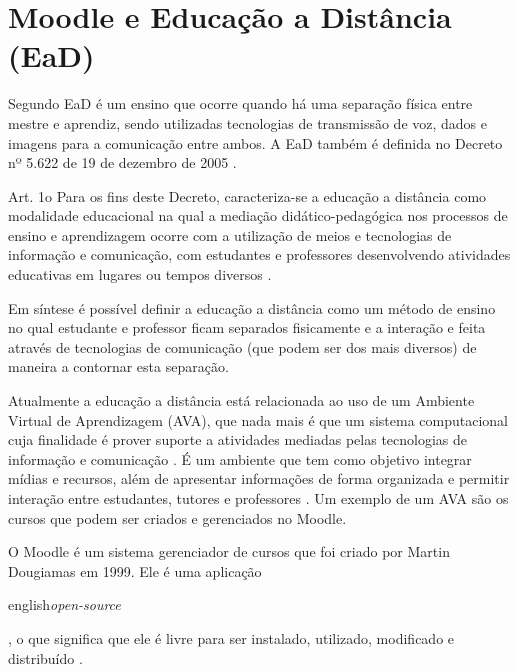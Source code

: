 \documentclass[
	12pt,				%
	openright,			%
	oneside,			%
	a4paper,			%
	english,			%
	french,				%
	spanish,			%
	brazil				%
	]{abntex2}
\begin{document}
\section{Moodle e Educação a Distância (EaD)}\label{cap-ead}

Segundo  EaD é um ensino que ocorre quando há uma separação física entre mestre e aprendiz, sendo utilizadas tecnologias de transmissão de voz, dados e imagens para a comunicação entre ambos. A EaD também é definida no Decreto nº 5.622 de 19 de dezembro de 2005 \cite{BRASIL2005}.
 \begin{citacao}
 	Art. 1o  Para os fins deste Decreto, caracteriza-se a educação a distância como modalidade educacional na qual a mediação didático-pedagógica nos processos de ensino e aprendizagem ocorre com a utilização de meios e tecnologias de informação e comunicação, com estudantes e professores desenvolvendo atividades educativas em lugares ou tempos diversos \cite{BRASIL2005}.
 \end{citacao}
 
Em síntese é possível definir a educação a distância como um método de ensino no qual estudante e professor ficam separados fisicamente e a interação e feita através de tecnologias de comunicação (que podem ser dos mais diversos) de maneira a contornar esta separação.

Atualmente a educação a distância está relacionada ao uso de um Ambiente Virtual de Aprendizagem (AVA), que nada mais é que um sistema computacional cuja finalidade é prover suporte a atividades mediadas pelas tecnologias de informação e comunicação \cite{Almeida2010}. É um ambiente que tem como objetivo integrar mídias e recursos, além de apresentar informações de forma organizada e permitir interação entre estudantes, tutores e professores \cite{Franciscato2008}. Um exemplo de um AVA são os cursos que podem ser criados e gerenciados no Moodle.
   
O Moodle é um sistema gerenciador de cursos que foi criado por Martin Dougiamas em 1999. Ele é uma aplicação \begin{otherlanguage*}{english}\textit{open-source}\end{otherlanguage*}, o que significa que ele é livre para ser instalado, utilizado, modificado e distribuído \cite{Dougiamas2003}. 
\end{document}
